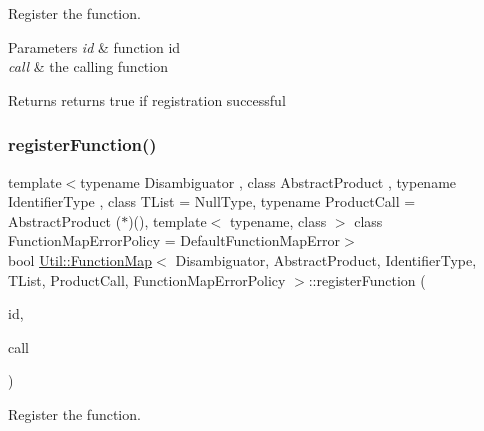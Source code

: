 Register the function. 


\begin{DoxyParams}{Parameters}
{\em id} & function id \\
\hline
{\em call} & the calling function \\
\hline
\end{DoxyParams}
\begin{DoxyReturn}{Returns}
returns true if registration successful 
\end{DoxyReturn}
\mbox{\label{classUtil_1_1FunctionMap_a9668b22d7c1d46b48b069dfec3301aa4}} 
\subsubsection{\texorpdfstring{registerFunction()}{registerFunction()}\hspace{0.1cm}{\footnotesize\ttfamily [2/2]}}
{\footnotesize\ttfamily template$<$typename Disambiguator , class Abstract\+Product , typename Identifier\+Type , class T\+List  = Null\+Type, typename Product\+Call  = Abstract\+Product ($\ast$)(), template$<$ typename, class $>$ class Function\+Map\+Error\+Policy = Default\+Function\+Map\+Error$>$ \\
bool \mbox{\hyperlink{classUtil_1_1FunctionMap}{Util\+::\+Function\+Map}}$<$ Disambiguator, Abstract\+Product, Identifier\+Type, T\+List, Product\+Call, Function\+Map\+Error\+Policy $>$\+::register\+Function (\begin{DoxyParamCaption}\item[{const Identifier\+Type \&}]{id,  }\item[{Product\+Call}]{call }\end{DoxyParamCaption})\hspace{0.3cm}{\ttfamily [inline]}}



Register the function. 



